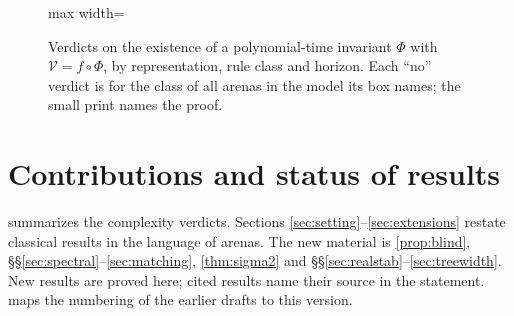 \documentclass[11pt]{amsart}
\theoremstyle{plain}
\theoremstyle{definition}
\theoremstyle{remark}
\numberwithin{equation}{section}
\newcommand{\val}{\mathcal{V}}            %
\newcommand{\pay}{\mathcal{U}}            %
\begin{document}
\begin{figure}[t]
\begin{adjustbox}{max width=\linewidth}
\end{adjustbox}
\caption{Verdicts on the existence of a polynomial-time invariant $\Phi$ with $\val=f\circ\Phi$, by representation, rule class and horizon. Each ``no'' verdict is for the class of all arenas in the model its box names; the small print names the proof.}
\label{fig:glance}
\end{figure}

\section*{Contributions and status of results}

 summarizes the complexity verdicts. Sections \ref{sec:setting}--\ref{sec:extensions} restate classical results in the language of arenas. The new material is \cref{prop:blind}, \S\S\ref{sec:spectral}--\ref{sec:matching}, \cref{thm:sigma2} and \S\S\ref{sec:realstab}--\ref{sec:treewidth}. New results are proved here; cited results name their source in the statement.  maps the numbering of the earlier drafts to this version.
\end{document}
